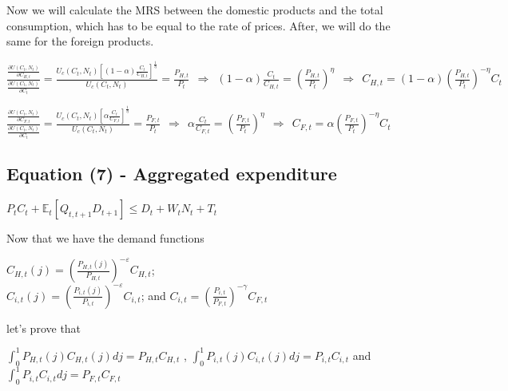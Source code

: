 \documentclass[
]{article}
\begin{document}
\vspace{8pt}

Now we will calculate the MRS between the domestic products and the
total consumption, which has to be equal to the rate of prices. After,
we will do the same for the foreign products.

\(\displaystyle \frac{\displaystyle \frac{\partial U(C_t,N_t)}{\displaystyle \partial C_{H,t}}}{\frac{\displaystyle \partial U(C_t,N_t)}{\displaystyle \partial C_t}} = \frac{\displaystyle U_c(C_t,N_t) \left[ (1-\alpha) \frac{C_t}{C_{H,t}} \right]^{\frac{1}{\eta}}}{\displaystyle U_c(C_t,N_t) } = \frac{P_{H,t}}{P_t} \ \ \Rightarrow \ \ (1-\alpha) \frac{C_t}{C_{H,t}} = \left( \frac{P_{H,t}}{P_t} \right)^\eta \ \ \Rightarrow \ \ C_{H,t} = (1-\alpha)\left( \frac{P_{H,t}}{P_t} \right)^{-\eta}C_t\)

\(\displaystyle \frac{\displaystyle \frac{\partial U(C_t,N_t)}{\displaystyle \partial C_{F,t}}}{\frac{\displaystyle \partial U(C_t,N_t)}{\displaystyle \partial C_t}} = \frac{\displaystyle U_c(C_t,N_t) \left[ \alpha \frac{C_t}{C_{F,t}} \right]^{\frac{1}{\eta}}}{\displaystyle U_c(C_t,N_t) } = \frac{P_{F,t}}{P_t} \ \ \Rightarrow \ \ \alpha \frac{C_t}{C_{F,t}} = \left( \frac{P_{F,t}}{P_t} \right)^\eta \ \ \Rightarrow \ \ C_{F,t} = \alpha \left( \frac{P_{F,t}}{P_t} \right)^{-\eta}C_t\)

\vspace{12pt}

\hypertarget{equation-7---aggregated-expenditure}{%
\subsection{Equation (7) - Aggregated
expenditure}\label{equation-7---aggregated-expenditure}}

\(\displaystyle P_t C_t + \mathbb{E}_t[ Q_{t,t+1}D_{t+1}] \leq D_t + W_tN_t + T_t\)

\vspace{8pt}

Now that we have the demand functions

\(\displaystyle C_{H,t}(j)= \left( \frac{P_{H,t}(j)}{P_{H,t}}\right)^{-\varepsilon}C_{H,t}\);\\
\(\displaystyle C_{i,t}(j)= \left( \frac{P_{i,t}(j)}{P_{i,t}}\right)^{-\varepsilon}C_{i,t}\);
and
\(\displaystyle C_{i,t}= \left( \frac{P_{i,t}}{P_{F,t}}\right)^{-\gamma}C_{F,t}\)

let's prove that

\(\displaystyle \int_0^1 P_{H,t}(j)C_{H,t}(j)dj = P_{H,t}C_{H,t}\) ,
\(\displaystyle \int_0^1 P_{i,t}(j)C_{i,t}(j)dj = P_{i,t}C_{i,t}\) and
\(\displaystyle \int_0^1 P_{i,t}C_{i,t}dj = P_{F,t}C_{F,t}\)
\end{document}
